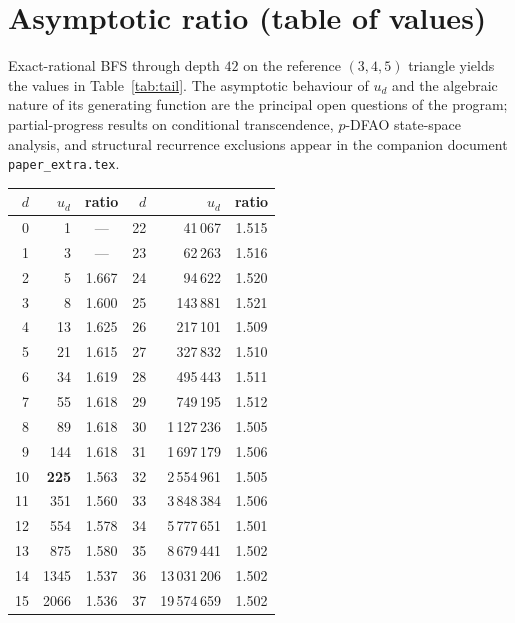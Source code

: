 \documentclass[11pt,a4paper]{article}
\theoremstyle{remark}
\theoremstyle{plain}
\begin{document}
\section{Asymptotic ratio (table of values)}
\label{sec:tail}

Exact-rational BFS through depth $42$ on the reference $(3, 4, 5)$
triangle yields the values in Table~\ref{tab:tail}.  The asymptotic
behaviour of $u_d$ and the algebraic nature of its generating function
are the principal open questions of the program; partial-progress
results on conditional transcendence, $p$-DFAO state-space analysis,
and structural recurrence exclusions appear in the companion document
\texttt{paper\_extra.tex}.

\begin{table}[ht!]
\centering
\small
\begin{tabular}{r r c r r c}
\toprule
$d$ & $u_d$ & ratio & $d$ & $u_d$ & ratio \\
\midrule
0  & 1                  & ---   & 22 & 41\,067          & 1.515 \\
1  & 3                  & ---   & 23 & 62\,263          & 1.516 \\
2  & 5                  & 1.667 & 24 & 94\,622          & 1.520 \\
3  & 8                  & 1.600 & 25 & 143\,881         & 1.521 \\
4  & 13                 & 1.625 & 26 & 217\,101         & 1.509 \\
5  & 21                 & 1.615 & 27 & 327\,832         & 1.510 \\
6  & 34                 & 1.619 & 28 & 495\,443         & 1.511 \\
7  & 55                 & 1.618 & 29 & 749\,195         & 1.512 \\
8  & 89                 & 1.618 & 30 & 1\,127\,236      & 1.505 \\
9  & 144                & 1.618 & 31 & 1\,697\,179      & 1.506 \\
10 & \textbf{225}       & 1.563 & 32 & 2\,554\,961      & 1.505 \\
11 & 351                & 1.560 & 33 & 3\,848\,384      & 1.506 \\
12 & 554                & 1.578 & 34 & 5\,777\,651      & 1.501 \\
13 & 875                & 1.580 & 35 & 8\,679\,441      & 1.502 \\
14 & 1345               & 1.537 & 36 & 13\,031\,206     & 1.502 \\
15 & 2066               & 1.536 & 37 & 19\,574\,659    & 1.502 \\

\end{tabular}
\end{table}
\end{document}
